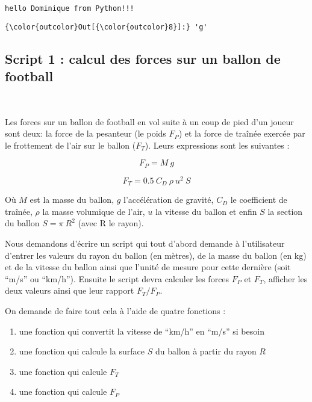 \documentclass{article}
\begin{document}
    \begin{Verbatim}[commandchars=\\\{\}]
hello Dominique from Python!!!

    \end{Verbatim}

            \begin{Verbatim}[commandchars=\\\{\}]
{\color{outcolor}Out[{\color{outcolor}8}]:} 'g'
\end{Verbatim}
        
    \subsection{Script 1 : calcul des forces sur un ballon de
football}\label{script-1-calcul-des-forces-sur-un-ballon-de-football}

    \begin{center}
    \end{center}
    { \hspace*{\fill} \\}
    

    Les forces sur un ballon de football en vol suite à un coup de pied d'un
joueur sont deux: la force de la pesanteur (le poids \(F_P\)) et la
force de traînée exercée par le frottement de l'air sur le ballon
(\(F_T\)). Leurs expressions sont les suivantes :

    \[F_P = M\ g\]

\[F_T = 0.5 \ C_D \ \rho \ u^2\ S \]

    Où \(M\) est la masse du ballon, \(g\) l'accélération de gravité,
\(C_D\) le coefficient de traînée, \(\rho\) la masse volumique de l'air,
\(u\) la vitesse du ballon et enfin \(S\) la section du ballon
\(S=\pi\ R^2\) (avec R le rayon).

    Nous demandons d'écrire un script qui tout d'abord demande à
l'utilisateur d'entrer les valeurs du rayon du ballon (en mètres), de la
masse du ballon (en kg) et de la vitesse du ballon ainsi que l'unité de
mesure pour cette dernière (soit ``m/s'' ou ``km/h''). Ensuite le script
devra calculer les forces \(F_P\) et \(F_T\), afficher les deux valeurs
ainsi que leur rapport \(F_T/F_P\).

    On demande de faire tout cela à l'aide de quatre fonctions :

\begin{enumerate}
\def\labelenumi{\arabic{enumi})}
\item
  une fonction qui convertit la vitesse de ``km/h'' en ``m/s'' si besoin
\item
  une fonction qui calcule la surface \(S\) du ballon à partir du rayon
  \(R\)
\item
  une fonction qui calcule \(F_T\)
\item
  une fonction qui calcule \(F_P\)
\end{enumerate}
\end{document}
